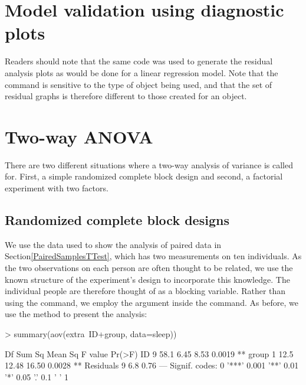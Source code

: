 \section{Model validation using diagnostic plots} 
 
Readers should note that the same code was used to generate the residual analysis plots as would be done for a linear regression model. Note that the  command is sensitive to the type of object being used, and that the set of residual graphs is therefore different to those created for an  object. 
 
\section{Two-way ANOVA} 
 
There are two different situations where a two-way analysis of variance is called for. First, a simple randomized complete block design and second, a factorial experiment with two factors. 
 
\subsection{Randomized complete block designs} 
\label{RCBAnalysis} 
 
We use the  data used to show the analysis of paired data in Section\ref{PairedSamplesTTest}, which has two measurements on ten individuals. As the two observations on each person are often thought to be related, we use the known structure of the experiment's design to incorporate this knowledge. The individual people are therefore thought of as a blocking variable. Rather than using the  command, we employ the  argument inside the  command. As before, we use the  method to present the analysis: 

\begin{Schunk}
\begin{Sinput}
> summary(aov(extra~ID+group, data=sleep)) 
\end{Sinput}
\begin{Soutput}
            Df Sum Sq Mean Sq F value Pr(>F)   
ID           9   58.1    6.45    8.53 0.0019 **
group        1   12.5   12.48   16.50 0.0028 **
Residuals    9    6.8    0.76                  
---
Signif. codes:  
0 '***' 0.001 '**' 0.01 '*' 0.05 '.' 0.1 ' ' 1
\end{Soutput}
\end{Schunk}

